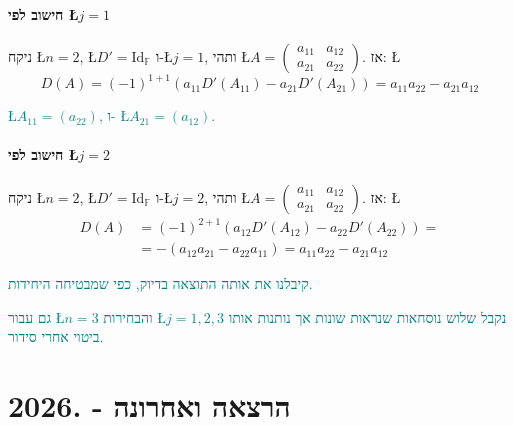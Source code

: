 \documentclass[english,hebrew]{article}
\begin{document}
\subsection{חישוב לפי \L{$j=1$}}

ניקח \L{$n=2$}, \L{$D'=\text{Id}_{\mathbb{F}}$} ו-\L{$j=1$}, ותהי
\L{$A=\begin{pmatrix}a_{11} & a_{12}\\
a_{21} & a_{22}
\end{pmatrix}$}. אז: \L{%
\[
D(A)=(-1)^{1+1}\left(a_{11}D'(A_{11})-a_{21}D'(A_{21})\right)=a_{11}a_{22}-a_{21}a_{12}
\]
}%

\textcolor{teal}{\L{$A_{11}=(a_{22})$}, ו- \L{$A_{21}=(a_{12})$}.}

\subsection{חישוב לפי \L{$j=2$}}

ניקח \L{$n=2$}, \L{$D'=\text{Id}_{\mathbb{F}}$} ו-\L{$j=2$}, ותהי
\L{$A=\begin{pmatrix}a_{11} & a_{12}\\
a_{21} & a_{22}
\end{pmatrix}$}. אז: \L{%
\begin{align*}
D(A) & =(-1)^{2+1}\left(a_{12}D'(A_{12})-a_{22}D'(A_{22})\right)=\\
 & =-\left(a_{12}a_{21}-a_{22}a_{11}\right)=a_{11}a_{22}-a_{21}a_{12}
\end{align*}
}%

\textcolor{teal}{קיבלנו את אותה התוצאה בדיוק, כפי שמבטיחה היחידות.}

\textcolor{teal}{גם עבור \L{$n=3$} והבחירות \L{$j=1,2,3$} נקבל שלוש
נוסחאות שנראות שונות אך נותנות אותו ביטוי אחרי סידור.}

\newpage{}

\noindent{}

\part{הרצאה {\endL} ואחרונה - {.2026\endL}}
\end{document}
